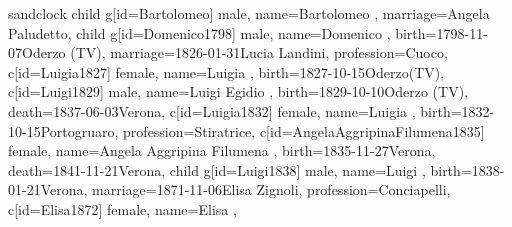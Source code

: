 \documentclass{article}
\begin{document}
\begin{center}
        \begin{genealogypicture}[
        processing=database,
        database format=full,
        node size=3.5cm,
        level size=2.8cm,
        level distance=6mm,
        list separators hang=3mm,
        name font=\bfseries,
        surn code={\textcolor{black!50!black}{#1}},
        place text={\newline}{},
        date format=d month yyyy,
        tcbset={male/.style={colframe=blue,colback=blue!5},
        female/.style={colframe=red,colback=red!5}},
        box={fit basedim=7pt,boxsep=2pt,segmentation style=solid,
            halign=left,before upper=\parskip1pt,
            \gtrDBsex,
        },
    ]
    sandclock
    {
        child{
            g[id=Bartolomeo] {
                male,
                name={Bartolomeo },
                marriage={Angela Paludetto}{},
            }
            child{
                g[id=Domenico1798]{
                    male,
                    name={Domenico },
                    birth={1798-11-07}{Oderzo (TV)},
                    marriage={1826-01-31}{Lucia Landini},
                    profession={Cuoco},
                }
                c[id=Luigia1827]{
                    female,
                    name={Luigia },
                    birth={1827-10-15}{Oderzo(TV)},
                }
                c[id=Luigi1829]{
                    male,
                    name={Luigi Egidio },
                    birth={1829-10-10}{Oderzo (TV)},
                    death={1837-06-03}{Verona},
                }
                c[id=Luigia1832]{
                    female,
                    name={Luigia },
                    birth={1832-10-15}{Portogruaro},
                    profession={Stiratrice},
                }
                c[id=AngelaAggripinaFilumena1835]{
                    female,
                    name={Angela Aggripina Filumena },
                    birth={1835-11-27}{Verona},
                    death={1841-11-21}{Verona},
                }
                child{
                    g[id=Luigi1838]{
                        male,
                        name={Luigi },
                        birth={1838-01-21}{Verona},
                        marriage={1871-11-06}{Elisa Zignoli},
                        profession={Conciapelli},
                    }
                    c[id=Elisa1872]{
                        female,
                        name={Elisa },
}}}}}
\end{genealogypicture}
\end{center}
\end{document}
